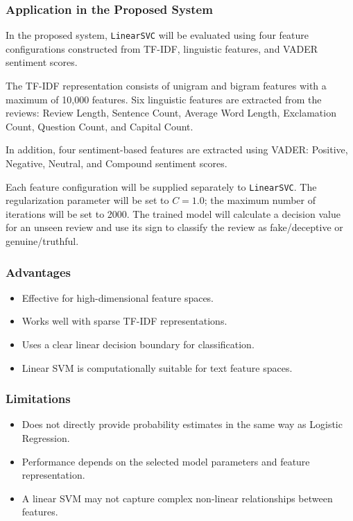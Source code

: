 \documentclass[12pt,a4paper]{report}
\begin{document}
\subsubsection*{Application in the Proposed System}

In the proposed system, \texttt{LinearSVC} will be evaluated using four feature configurations constructed from TF-IDF, linguistic features, and VADER sentiment scores.

The TF-IDF representation consists of unigram and bigram features with a maximum of 10,000 features. Six linguistic features are extracted from the reviews: Review Length, Sentence Count, Average Word Length, Exclamation Count, Question Count, and Capital Count.

In addition, four sentiment-based features are extracted using VADER: Positive, Negative, Neutral, and Compound sentiment scores.

Each feature configuration will be supplied separately to \texttt{LinearSVC}. The regularization parameter will be set to \(C=1.0\); the maximum number of iterations will be set to 2000. The trained model will calculate a decision value for an unseen review and use its sign to classify the review as fake/deceptive or genuine/truthful.

\subsubsection*{Advantages}

\begin{itemize}
    \item Effective for high-dimensional feature spaces.
    \item Works well with sparse TF-IDF representations.
    \item Uses a clear linear decision boundary for classification.
    \item Linear SVM is computationally suitable for text feature spaces.
\end{itemize}

\subsubsection*{Limitations}

\begin{itemize}
    \item Does not directly provide probability estimates in the same way as Logistic Regression.
    \item Performance depends on the selected model parameters and feature representation.
    \item A linear SVM may not capture complex non-linear relationships between features.
\end{itemize}
\end{document}
